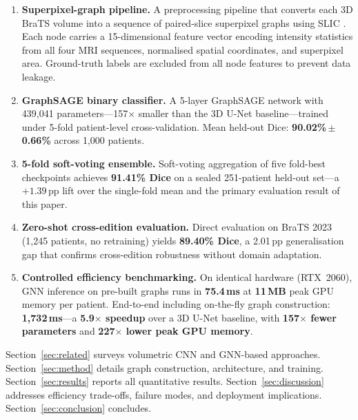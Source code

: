 \documentclass{article}
\begin{document}
\begin{enumerate}
    \item \textbf{Superpixel-graph pipeline.} A preprocessing pipeline that
    converts each 3D BraTS volume into a sequence of paired-slice superpixel
    graphs using SLIC \cite{achanta2012slic}. Each node carries a
    15-dimensional feature vector encoding intensity statistics from all four
    MRI sequences, normalised spatial coordinates, and superpixel area.
    Ground-truth labels are excluded from all node features to prevent
    data leakage.

    \item \textbf{GraphSAGE binary classifier.} A 5-layer GraphSAGE
    \cite{hamilton2017graphsage} network with 439,041 parameters---157$\times$
    smaller than the 3D U-Net baseline---trained under 5-fold patient-level
    cross-validation. Mean held-out Dice:
    \textbf{90.02\%\,$\pm$\,0.66\%} across 1,000 patients.

    \item \textbf{5-fold soft-voting ensemble.} Soft-voting aggregation of
    five fold-best checkpoints achieves \textbf{91.41\% Dice} on a sealed
    251-patient held-out set---a $+1.39$\,pp lift over the single-fold mean
    and the primary evaluation result of this paper.

    \item \textbf{Zero-shot cross-edition evaluation.} Direct evaluation on
    BraTS 2023 (1,245 patients, no retraining) yields \textbf{89.40\% Dice},
    a 2.01\,pp generalisation gap that confirms cross-edition robustness
    without domain adaptation.

    \item \textbf{Controlled efficiency benchmarking.} On identical hardware
    (RTX~2060), GNN inference on pre-built graphs runs in
    \textbf{75.4\,ms} at \textbf{11\,MB} peak GPU memory per patient.
    End-to-end including on-the-fly graph construction:
    \textbf{1,732\,ms}---a \textbf{5.9$\times$ speedup} over a 3D U-Net
    \cite{cicek20163d} baseline, with \textbf{157$\times$ fewer parameters}
    and \textbf{227$\times$ lower peak GPU memory}.
\end{enumerate}

Section~\ref{sec:related} surveys volumetric CNN and GNN-based approaches.
Section~\ref{sec:method} details graph construction, architecture, and training.
Section~\ref{sec:results} reports all quantitative results.
Section~\ref{sec:discussion} addresses efficiency trade-offs, failure modes, and
deployment implications. Section~\ref{sec:conclusion} concludes.
\end{document}
